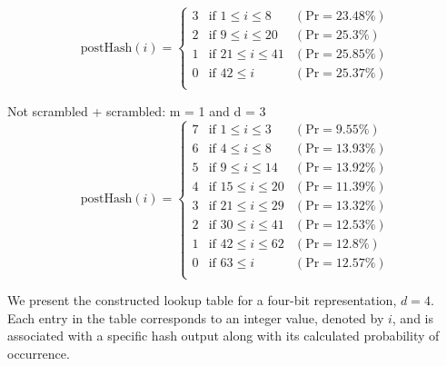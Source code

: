 {\renewcommand{\arraystretch}{1.25}
\[
\text{postHash}(i) = \left\{
    \begin{array}{lll}
        \text{3}  & \text{if } 1 \leq i \leq 8 & (\text{Pr} = 23.48\%)
        \\
        \text{2}  & \text{if } 9 \leq i \leq 20 & (\text{Pr} = 25.3\%)
        \\
        \text{1}  & \text{if } 21 \leq i \leq 41 & (\text{Pr} = 25.85\%)
        \\
        \text{0}  & \text{if } 42 \leq i & (\text{Pr} = 25.37\%)
        \\
    \end{array}
\right.    
\]}


Not scrambled + scrambled: m = 1 and d = 3
{\renewcommand{\arraystretch}{1.25}
\[
\text{postHash}(i) = \left\{
    \begin{array}{lll}
        \text{7}  & \text{if } 1 \leq i \leq 3 & (\text{Pr} = 9.55\%)
        \\
        \text{6}  & \text{if } 4 \leq i \leq 8 & (\text{Pr} = 13.93\%)
        \\
        \text{5}  & \text{if } 9 \leq i \leq 14 & (\text{Pr} = 13.92\%)
        \\
        \text{4}  & \text{if } 15 \leq i \leq 20 & (\text{Pr} = 11.39\%)
        \\
        \text{3}  & \text{if } 21 \leq i \leq 29 & (\text{Pr} = 13.32\%)
        \\
        \text{2}  & \text{if } 30 \leq i \leq 41 & (\text{Pr} = 12.53\%)
        \\
        \text{1}  & \text{if } 42 \leq i \leq 62 & (\text{Pr} = 12.8\%)
        \\
        \text{0}  & \text{if } 63 \leq i & (\text{Pr} = 12.57\%)
        \\
    \end{array}
\right.    
\]}


We present the constructed lookup table for a four-bit representation, \(d=4\). Each entry in the table corresponds to an integer value, denoted by \(i\), and is associated with a specific hash output along with its calculated probability of occurrence.

